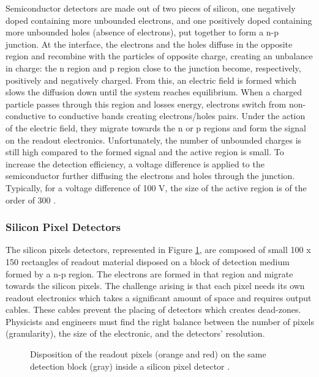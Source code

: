 			Semiconductor detectors are made out of two pieces of silicon, one negatively doped containing more unbounded electrons, and one positively doped containing more unbounded holes (absence of electrons), put together to form a n-p junction. At the interface, the electrons and the holes diffuse in the opposite region and recombine with the particles of opposite charge, creating an unbalance in charge: the n region and p region close to the junction become, respectively, positively and negatively charged. From this, an electric field is formed which slows the diffusion down until the system reaches equilibrium. When a charged particle passes through this region and losses energy, electrons switch from non-conductive to conductive bands creating electrons/holes pairs. Under the action of the electric field, they migrate towards the n or p regions and form the signal on the readout electronics. Unfortunately, the number of unbounded charges is still high compared to the formed signal and the active region is small. To increase the detection efficiency, a voltage difference is applied to the semiconductor further diffusing the electrons and holes through the junction. Typically, for a voltage difference of 100 V, the size of the active region is of the order of 300 \um{}.

			\subsubsection{Silicon Pixel Detectors}
			\label{sec:lhc_and_cms__silicon_pixel_detectors}

				The silicon pixels detectors, represented in Figure \ref{fig:lhc_and_cms__cms_pixel_detector}, are composed of small 100 \um{} x 150 \um{} rectangles of readout material disposed on a block of detection medium formed by a n-p region. The electrons are formed in that region and migrate towards the silicon pixels. The challenge arising is that each pixel needs its own readout electronics which takes a significant amount of space and requires output cables. These cables prevent the placing of detectors which creates dead-zones. Physicists and engineers must find the right balance between the number of pixels (granularity), the size of the electronic, and the detectors' resolution. \\

				\begin{figure}[h!]
					\centering
					\caption{Disposition of the readout pixels (orange and red) on the same detection block (gray) inside a silicon pixel detector \Cite{CMS_Tracker_Construction}.}
					\label{fig:lhc_and_cms__cms_pixel_detector}
				\end{figure}


